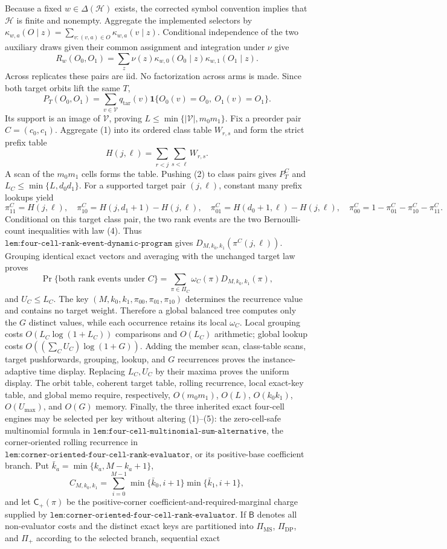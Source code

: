 Because a fixed \(w\in\Delta(\mathcal H)\) exists, the corrected symbol convention implies that \(\mathcal H\) is finite and nonempty. Aggregate the implemented selectors by \(\kappa_{w,a}(O\mid z)=\sum_{v:(v,a)\in O}\kappa_{w,a}(v\mid z)\). Conditional independence of the two auxiliary draws given their common assignment and integration under \(\nu\) give \[R_w(O_0,O_1)=\sum_z\nu(z)\kappa_{w,0}(O_0\mid z)\kappa_{w,1}(O_1\mid z).\tag{1}\] Across replicates these pairs are iid. No factorization across arms is made. Since both target orbits lift the same \(T\), \[P_T(O_0,O_1)=\sum_{v\in\mathcal V}q_{\mathrm{tar}}(v)\mathbf 1\{O_0(v)=O_0,\ O_1(v)=O_1\}.\tag{2}\] Its support is an image of \(\mathcal V\), proving \(L\le\min\{|\mathcal V|,m_0m_1\}\). Fix a preorder pair \(C=(c_0,c_1)\). Aggregate (1) into its ordered class table \(W_{r,s}\) and form the strict prefix table \[H(j,\ell)=\sum_{r<j}\sum_{s<\ell}W_{r,s}.\tag{3}\] A scan of the \(m_0m_1\) cells forms the table. Pushing (2) to class pairs gives \(P_T^C\) and \(L_C\le\min\{L,d_0d_1\}\). For a supported target pair \((j,\ell)\), constant many prefix lookups yield \[\pi^C_{11}=H(j,\ell),\quad \pi^C_{10}=H(j,d_1+1)-H(j,\ell),\quad \pi^C_{01}=H(d_0+1,\ell)-H(j,\ell),\quad \pi^C_{00}=1-\pi^C_{01}-\pi^C_{10}-\pi^C_{11}.\tag{4}\] Conditional on this target class pair, the two rank events are the two Bernoulli-count inequalities with law (4). Thus \(\texttt{lem:four-cell-rank-event-dynamic-program}\) gives \(D_{M,k_0,k_1}(\pi^C(j,\ell))\). Grouping identical exact vectors and averaging with the unchanged target law proves \[\Pr\{\text{both rank events under }C\}=\sum_{\pi\in\Pi_C}\omega_C(\pi)D_{M,k_0,k_1}(\pi),\tag{5}\] and \(U_C\le L_C\). The key \((M,k_0,k_1,\pi_{00},\pi_{01},\pi_{10})\) determines the recurrence value and contains no target weight. Therefore a global balanced tree computes only the \(G\) distinct values, while each occurrence retains its local \(\omega_C\). Local grouping costs \(O(L_C\log(1+L_C))\) comparisons and \(O(L_C)\) arithmetic; global lookup costs \(O((\sum_CU_C)\log(1+G))\). Adding the member scan, class-table scans, target pushforwards, grouping, lookup, and \(G\) recurrences proves the instance-adaptive time display. Replacing \(L_C,U_C\) by their maxima proves the uniform display. The orbit table, coherent target table, rolling recurrence, local exact-key table, and global memo require, respectively, \(O(m_0m_1)\), \(O(L)\), \(O(k_0k_1)\), \(O(U_{\max})\), and \(O(G)\) memory. Finally, the three inherited exact four-cell engines may be selected per key without altering (1)--(5): the zero-cell-safe multinomial formula in \(\texttt{lem:four-cell-multinomial-sum-alternative}\), the corner-oriented rolling recurrence in \(\texttt{lem:corner-oriented-four-cell-rank-evaluator}\), or its positive-base coefficient branch. Put \(\bar k_a=\min\{k_a,M-k_a+1\}\), \[C_{M,k_0,k_1}=\sum_{i=0}^{M-1}\min\{\bar k_0,i+1\}\min\{\bar k_1,i+1\},\] and let \(\mathsf C_+(\pi)\) be the positive-corner coefficient-and-required-marginal charge supplied by \(\texttt{lem:corner-oriented-four-cell-rank-evaluator}\). If \(\mathsf B\) denotes all non-evaluator costs and the distinct exact keys are partitioned into \(\Pi_{\mathrm{MS}}\), \(\Pi_{\mathrm{DP}}\), and \(\Pi_+\) according to the selected branch, sequential exact 